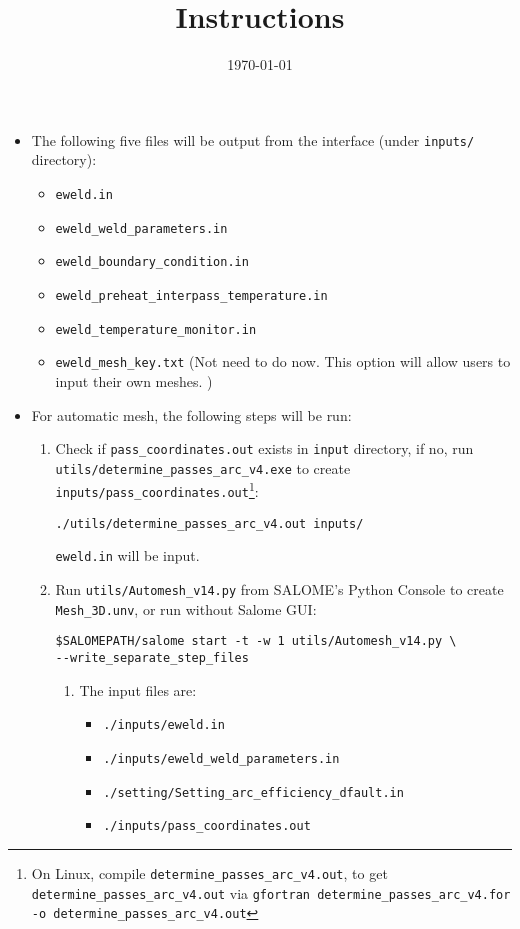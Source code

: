 \documentclass[12pt,letterpaper]{article}
\date{\today}
\title{Instructions}
\newcommand{\verbStyle}[1]{{\color{SteelBlue40}\colorbox{LightSteelBlue10}{{#1}}}}
\let\OldTexttt\texttt
\renewcommand{\texttt}[1]{\OldTexttt{\verbStyle{#1}}}
\begin{document}
\maketitle
\begin{itemize}
\item The following five files will be output from the interface (under \texttt{inputs/} directory):
\begin{itemize}
\item \texttt{eweld.in}
\item \texttt{eweld\_weld\_parameters.in}
\item \texttt{eweld\_boundary\_condition.in}
\item \texttt{eweld\_preheat\_interpass\_temperature.in}
\item \texttt{eweld\_temperature\_monitor.in}
\item \texttt{eweld\_mesh\_key.txt} (Not need to do now. This option will allow users to input their own meshes. )
\end{itemize}

\item For automatic mesh, the following steps will be run:
\begin{enumerate}
\item Check if \texttt{pass\_coordinates.out} exists in \texttt{input} directory, if no, run \\
\texttt{utils/determine\_passes\_arc\_v4.exe} to create \texttt{inputs/pass\_coordinates.out}\footnote{On Linux, compile \texttt{determine\_passes\_arc\_v4.out}, to get \texttt{determine\_passes\_arc\_v4.out} via \texttt{gfortran determine\_passes\_arc\_v4.for -o determine\_passes\_arc\_v4.out}}:
\begin{verbatim}
./utils/determine_passes_arc_v4.out inputs/
\end{verbatim}
\texttt{eweld.in} will be input.
\item Run \texttt{utils/Automesh\_v14.py} from SALOME's Python Console to create \texttt{Mesh\_3D.unv}, or run 
without Salome GUI:
\begin{verbatim}
$SALOMEPATH/salome start -t -w 1 utils/Automesh_v14.py \
--write_separate_step_files
\end{verbatim}
\begin{enumerate}
\item The input files are:
\begin{itemize}
\item \texttt{./inputs/eweld.in}
\item \texttt{./inputs/eweld\_weld\_parameters.in}
\item \texttt{./setting/Setting\_arc\_efficiency\_dfault.in}
\item \texttt{./inputs/pass\_coordinates.out}
\end{itemize}


\end{enumerate}
\end{enumerate}
\end{itemize}
\end{document}
